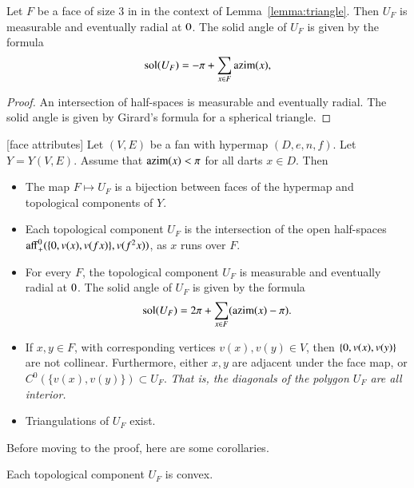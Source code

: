 \begin{corollary}\label{lemma:girard-component}
Let $F$ be a face of size $3$ in in the context of Lemma~\ref{lemma:triangle}.  Then $U_F$ is measurable and eventually radial at $0$.
The solid angle of $U_F$ is given by the formula
$$
\operatorname{sol}(U_F) = -\pi + \sum_{x\in F}{\operatorname{azim}}(x),
$$
\end{corollary}

\begin{proof} An intersection of half-spaces is measurable and
eventually radial.  The solid angle is given by Girard's formula for
a spherical triangle.
\end{proof}

\begin{lemma}[face attributes]\label{lemma:face}
Let $(V,E)$ be a fan with hypermap $(D,e,n,f)$. 
Let $Y=Y(V,E)$.
Assume that ${\operatorname{azim}}(x)<\pi$
for all darts $x\in D$.  Then
\begin{itemize}
\item The map $F\mapsto U_F$ is a bijection between faces of the hypermap
and topological components of $Y$.
\item  Each topological component $U_F$ is the intersection of the open
half-spaces ${\operatorname{aff}}_+^0(\{0,v(x),v({f x})\},v(f^2 x))$, as $x$ runs
over $F$.
\item For every $F$, the topological component $U_F$ is measurable and
eventually radial at $0$.  The solid angle of $U_F$ is given by the
formula
$$
\operatorname{sol}(U_F) = 2\pi + \sum_{x\in F}({\operatorname{azim}}(x)-\pi).
$$
\item If $x,y\in F$, with corresponding vertices $v(x),v(y)\in V$, then
$\{0,v(x),v(y)\}$ are not collinear.
Furthermore, 
either $x,y$ are adjacent under the face map, or $C^0(\{v(x),v(y)\})\subset U_F$.  {\it That is, the diagonals of the polygon $U_F$ are all interior.}
\item  Triangulations of $U_F$ exist.
\end{itemize}
\end{lemma}

Before moving to the proof, here are some corollaries.

\begin{corollary}
Each topological component $U_F$ is convex.
\end{corollary}

